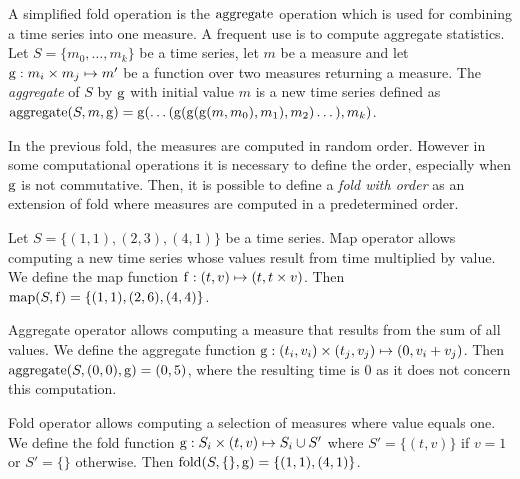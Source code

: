 A simplified fold operation is the $\operatorname*{aggregate}$ operation which is used for
combining a time series into one measure. A frequent use is to compute
aggregate statistics.  Let $S=\{m_0, \dotsc, m_k\}$ be a time series,
let $m$ be a measure and let $\operatorname*{g}: m_i \times m_j \mapsto m'$ be a
function over two measures returning a measure. The \emph{aggregate}
of $S$ by $\operatorname*{g}$ with initial value $m$ is a new time series defined
as $\operatorname*{aggregate}(S,m,\operatorname*{g}) = \operatorname*{g}(\dots(
\operatorname*{g}(\operatorname*{g}(\operatorname*{g}(m,m_0),\allowbreak m_1),\allowbreak m_2
)\dots),\allowbreak m_k)$.

In the previous fold, the measures are computed in random order.
However in some computational operations it is necessary to define the
order, especially when $\operatorname*{g}$ is not commutative.  Then, it is possible
to define a \emph{fold with order} as an extension of fold where
measures are computed in a predetermined order.




\begin{example}
\label{ex:computational-operators}
Let $S=\{(1,1),(2,3),(4,1)\}$ be a time series.  Map operator allows
computing a new time series whose values result from time multiplied
by value.  We define the map function $\operatorname*{f}: (t,v)\mapsto (t,t\times
v)$. Then $\operatorname*{map}(S,\operatorname*{f})=\{(1,1),(2,6),(4,4)\}$.


Aggregate operator allows computing a measure that results from the
sum of all values.  We define the aggregate function $\operatorname*{g}: (t_i,v_i)
\times (t_j,v_j) \mapsto (0,v_i+v_j)$. Then $\operatorname*{aggregate}(S,(0,0),\operatorname*{g}) =
(0,5)$, where the resulting time is 0 as it does not concern this
computation.


Fold operator allows computing a selection of measures where value
equals one.  We define the fold function $\operatorname*{g}: S_i \times (t,v)
\mapsto S_i \cup S'$ where $S'=\{(t,v)\}$ if $v=1$ or
$S'=\{\}$ otherwise. Then $\operatorname*{fold}(S,\{\},\operatorname*{g})=\{(1,1),(4,1)\}$.


\end{example}

